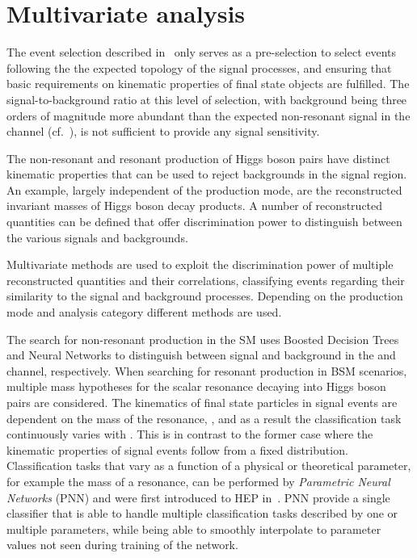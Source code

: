 \section{Multivariate analysis}

The event selection described in~ only
serves as a pre-selection to select events following the the expected
topology of the signal processes, and ensuring that basic requirements
on kinematic properties of final state objects are fulfilled. %
The signal-to-background ratio at this level of selection, with
background being three orders of magnitude more abundant than the
expected non-resonant \HH signal in the \hadhad channel
(cf.~), is not sufficient to provide
any signal sensitivity.

The non-resonant and resonant production of Higgs boson pairs have
distinct kinematic properties that can be used to reject backgrounds
in the signal region. An example, largely independent of the \HH
production mode, are the reconstructed invariant masses of Higgs boson
decay products. A number of reconstructed quantities can be defined
that offer discrimination power to distinguish between the various
signals and backgrounds.

Multivariate methods are used to exploit the discrimination power of
multiple reconstructed quantities and their correlations, classifying
events regarding their similarity to the signal and background
processes. Depending on the \HH production mode and analysis category
different methods are used.

The search for non-resonant \HH production in the SM uses Boosted
Decision Trees and Neural Networks to distinguish between signal and
background in the \hadhad and \lephad channel, respectively. When
searching for resonant \HH production in BSM scenarios, multiple mass
hypotheses for the scalar resonance decaying into Higgs boson pairs
are considered. The kinematics of final state particles in signal
events are dependent on the mass of the resonance, \mX, and as a
result the classification task continuously varies with \mX. This is
in contrast to the former case where the kinematic properties of
signal events follow from a fixed distribution. Classification tasks
that vary as a function of a physical or theoretical parameter, for
example the mass of a resonance, can be performed by \emph{Parametric
  Neural Networks} (PNN) and were first introduced to HEP
in~\cite{Baldi:2016fzo}. PNN provide a single classifier that is able
to handle multiple classification tasks described by one or multiple
parameters, while being able to smoothly interpolate to parameter
values not seen during training of the network.

